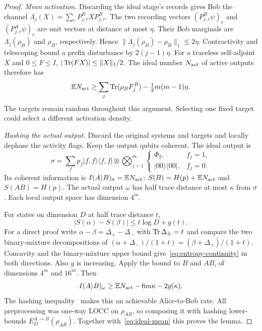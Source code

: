 \begin{proof}
\emph{Mean activation.} Discarding the ideal stage's records gives Bob the channel $\Lambda_j(X)=\sum_rP^B_{j,r}XP^B_{j,r}$. The two recording vectors $(P^B_{j,r}\psi)_r$ and $(P^A_{j,r}\psi)_r$ are unit vectors at distance at most $\eta$. Their Bob marginals are $\Lambda_j(\rho_B)$ and $\rho_B$, respectively. Hence $\|\Lambda_j(\rho_B)-\rho_B\|_1\le2\eta$. Contractivity and telescoping bound a prefix disturbance by $2(j-1)\eta$. For a traceless self-adjoint $X$ and $0\le F\le I$, $|\operatorname{Tr}(FX)|\le\|X\|_1/2$. The ideal number $N_{\rm act}$ of active outputs therefore has
\begin{equation}\label{eq:ideal-mean}
 \mathbb E N_{\rm act}\ge\sum_j\operatorname{Tr}(\rho_BF_j^B)-\tfrac12m(m-1)\eta.
\end{equation}
The targets remain random throughout this argument. Selecting one fixed target could select a different activation density.

\emph{Hashing the actual output.} Discard the original systems and targets and locally dephase the activity flags. Keep the output qubits coherent. The ideal output is
\[
 \sigma=\sum_f p_f|f,f\rangle\langle f,f|\otimes
 \bigotimes_{j=1}^m\begin{cases}\Phi_2,&f_j=1,\\|00\rangle\langle00|,&f_j=0.\end{cases}
\]
Its coherent information is $I(A\rangle B)_\sigma=\mathbb E N_{\rm act}$: $S(B)=H(p)+\mathbb E N_{\rm act}$ and $S(AB)=H(p)$. The actual output $\omega$ has half trace distance at most $\kappa$ from $\sigma$. Each local output space has dimension $4^m$.

For states on dimension $D$ at half trace distance $t$,
\begin{equation}\label{eq:entropy-continuity}
 |S(\alpha)-S(\beta)|\le t\log D+g(t).
\end{equation}
For a direct proof write $\alpha-\beta=\Delta_+-\Delta_-$ with $\operatorname{Tr}\Delta_\pm=t$ and compare the two binary-mixture decompositions of $(\alpha+\Delta_-)/(1+t)=(\beta+\Delta_+)/(1+t)$. Concavity and the binary-mixture upper bound give~\eqref{eq:entropy-continuity} in both directions. Also $g$ is increasing. Apply the bound to $B$ and $AB$, of dimensions $4^m$ and $16^m$. Then
\[
 I(A\rangle B)_\omega\ge\mathbb E N_{\rm act}-6m\kappa-2g(\kappa).
\]
The hashing inequality~\cite[Theorem~10]{DW05} makes this an achievable Alice-to-Bob rate. All preprocessing was one-way LOCC on $\rho_{AB}$, so composing it with hashing lower-bounds $E_D^{A\to B}(\rho_{AB})$. Together with~\eqref{eq:ideal-mean} this proves the lemma.
\end{proof}

